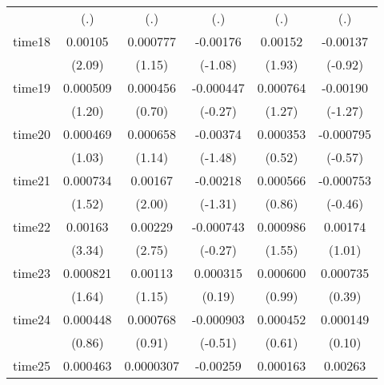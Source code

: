 \begin{table}[htbp]
\begin{tabular}{l*{5}{c}}
            &         (.)         &         (.)         &         (.)         &         (.)         &         (.)         \\
time18      &     0.00105\sym{*}  &    0.000777         &    -0.00176         &     0.00152         &    -0.00137         \\
            &      (2.09)         &      (1.15)         &     (-1.08)         &      (1.93)         &     (-0.92)         \\
time19      &    0.000509         &    0.000456         &   -0.000447         &    0.000764         &    -0.00190         \\
            &      (1.20)         &      (0.70)         &     (-0.27)         &      (1.27)         &     (-1.27)         \\
time20      &    0.000469         &    0.000658         &    -0.00374         &    0.000353         &   -0.000795         \\
            &      (1.03)         &      (1.14)         &     (-1.48)         &      (0.52)         &     (-0.57)         \\
time21      &    0.000734         &     0.00167\sym{*}  &    -0.00218         &    0.000566         &   -0.000753         \\
            &      (1.52)         &      (2.00)         &     (-1.31)         &      (0.86)         &     (-0.46)         \\
time22      &     0.00163\sym{***}&     0.00229\sym{**} &   -0.000743         &    0.000986         &     0.00174         \\
            &      (3.34)         &      (2.75)         &     (-0.27)         &      (1.55)         &      (1.01)         \\
time23      &    0.000821         &     0.00113         &    0.000315         &    0.000600         &    0.000735         \\
            &      (1.64)         &      (1.15)         &      (0.19)         &      (0.99)         &      (0.39)         \\
time24      &    0.000448         &    0.000768         &   -0.000903         &    0.000452         &    0.000149         \\
            &      (0.86)         &      (0.91)         &     (-0.51)         &      (0.61)         &      (0.10)         \\
time25      &    0.000463         &   0.0000307         &    -0.00259         &    0.000163         &     0.00263         \\

\end{tabular}
\end{table}
